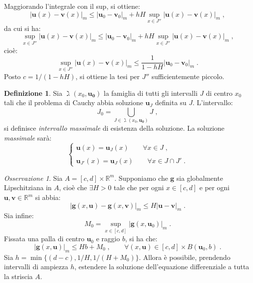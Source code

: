 \documentclass[a4paper,12pt]{report}
\theoremstyle{plain}
\theoremstyle{definition}
\newtheorem{defn}{Definizione}[section]
\theoremstyle{remark}
\newtheorem{oss}{Osservazione}[section]
\numberwithin{equation}{section}
\begin{document}
Maggiorando l'integrale con il sup, si ottiene:
\begin{equation}
|\mathbf{u}(x)-\mathbf{v}(x)|_m \le |\mathbf{u}_0-\mathbf{v}_0|_m+hH \sup_{x \in J''} |\mathbf{u}(x)-\mathbf{v}(x)|_m\;,
\end{equation}
da cui si ha:
\begin{equation}
\sup_{x \in J''} |\mathbf{u}(x)-\mathbf{v}(x)|_m \le |\mathbf{u}_0-\mathbf{v}_0|_m + hH \sup_{x \in J''} |\mathbf{u}(x)-\mathbf{v}(x)|_m\;,
\end{equation}
cioè:
\begin{equation}
\sup_{x \in J''} |\mathbf{u}(x)-\mathbf{v}(x)|_m \le \frac{1}{1-hH}|\mathbf{u}_0-\mathbf{v}_0|_m\;.
\end{equation}
Posto $c=1/(1-hH)$, si ottiene la tesi per $J''$ sufficientemente piccolo.
\endproof
\begin{defn} Sia $\gimel(x_0,\mathbf{u_0})$ la famiglia di tutti gli intervalli $J$ di centro $x_0$ tali che il problema di Cauchy abbia soluzione $\mathbf{u}_J$ definita su $J$. L'intervallo:
\begin{equation}
J_0 = \bigcup_{J \in \gimel(x_0,\mathbf{u_0})} J\;,
\end{equation}
si definisce \textit{intervallo massimale} di esistenza della soluzione. La soluzione \textit{massimale} sarà:
\begin{equation}
\begin{cases}
 \mathbf{u}(x)=\mathbf{u}_J(x) \qquad \forall x \in J\;, \\
 \\
 \mathbf{u}_{J'}(x)= \mathbf{u}_J(x) \qquad \forall x \in J\cap J'\;.
\end{cases}
\end{equation}
\end{defn}
\begin{oss} Sia $A=[c,d]\times \mathbb{R}^m$. Supponiamo che $\mathbf{g}$ sia globalmente Lipschitziana in $A$, cioè che $\exists H>0$ tale che per ogni $x\in [c,d]$ e per ogni $\mathbf{u},\mathbf{v}\in\mathbb{R}^m$ si abbia:
\begin{equation}
|\mathbf{g}(x,\mathbf{u})-\mathbf{g}(x,\mathbf{v})|_m \le H |\mathbf{u}-\mathbf{v}|_m\;.
\end{equation}
Sia infine:
\begin{equation}
M_0= \sup_{x \in [c,d]} |\mathbf{g}(x,\mathbf{u}_0)|_m\;.
\end{equation}
Fissata una palla di centro $\mathbf{u}_0$ e raggio $b$, si ha che:
\begin{equation}
|\mathbf{g}(x,\mathbf{u})|_m \le Hb+M_0\;, \qquad \forall(x,\mathbf{u}) \in [c,d]\times B(\mathbf{u}_0,b)\;.
\end{equation}
Sia $h=\min\{(d-c),1/H,1/(H+M_0)\}$. Allora è possibile, prendendo intervalli di ampiezza $h$, estendere la soluzione dell'equazione differenziale a tutta la striscia $A$.
\end{oss}
\end{document}
